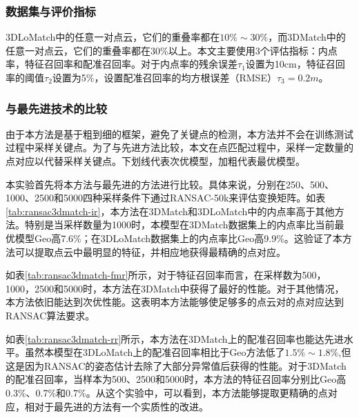     \subsubsection{数据集与评价指标}
    3DLoMatch中的任意一对点云，它们的重叠率都在$10\% \sim 30\%$，而3DMatch中的任意一对点云，它们的重叠率都在30\%以上。本文主要使用3个评估指标：内点率，特征召回率和配准召回率。对于内点率的残余误差$\tau_1$设置为10cm，特征召回率的阈值$\tau_2$设置为5\%，设置配准召回率的均方根误差（RMSE）$\tau_3 = 0.2m$。


    \subsubsection{与最先进技术的比较}
    由于本方法是基于粗到细的框架，避免了关键点的检测，本方法并不会在训练测试过程中采样关键点。为了与先进方法比较，本文在点匹配过程中，采样一定数量的点对应以代替采样关键点。下划线代表次优模型，加粗代表最优模型。

    本实验首先将本方法与最先进的方法进行比较。具体来说，分别在250、500、1000、2500和5000四种采样条件下通过RANSAC-50k来评估变换矩阵。如表\ref{tab:ransac3dmatch-ir}，本方法在3DMatch和3DLoMatch中的内点率高于其他方法。特别是当采样数量为1000时，本模型在3DMatch数据集上的内点率比当前最优模型Geo高7.6\%；在3DLoMatch数据集上的内点率比Geo高9.9\%。这验证了本方法可以提取点云中最明显的特征，并相应地获得最精确的点对应。
    \vspace{0.1cm}
    
    
    如表\ref{tab:ransac3dmatch-fmr}所示，对于特征召回率而言，在采样数为500，1000，2500和5000时，本方法在3DMatch中获得了最好的性能。对于其他情况，本方法依旧能达到次优性能。这表明本方法能够使足够多的点云对的点对应达到RANSAC算法要求。
    \vspace{0.1cm}
    
    
    如表\ref{tab:ransac3dmatch-rr}所示，本方法在3DMatch上的配准召回率也能达先进水平。虽然本模型在3DLoMatch上的配准召回率相比于Geo方法低了$1.5\% \sim 1.8\%$,但这是因为RANSAC的姿态估计去除了大部分异常值后获得的性能。对于3DMatch的配准召回率，当样本为500、2500和5000时，本方法的特征召回率分别比Geo高0.3\%、0.7\%和0.7\%。从这个实验中，可以看到，本方法能够提取更精确的点对应，相对于最先进的方法有一个实质性的改进。
    \vspace{0.1cm}
    

